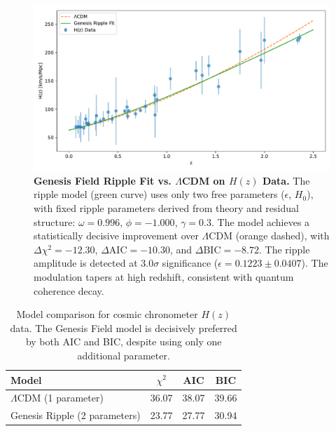 \vspace{1em}

\begin{figure}[htbp]
\centering
\includegraphics[width=\textwidth]{figures/Hz_ripple_vs_LCDM.pdf}
\caption{\textbf{Genesis Field Ripple Fit vs. $\Lambda$CDM on $H(z)$ Data.} The ripple model (green curve) uses only two free parameters ($\epsilon$, $H_0$), with fixed ripple parameters derived from theory and residual structure: $\omega = 0.996$, $\phi = -1.000$, $\gamma = 0.3$. The model achieves a statistically decisive improvement over $\Lambda$CDM (orange dashed), with $\Delta \chi^2 = -12.30$, $\Delta \text{AIC} = -10.30$, and $\Delta \text{BIC} = -8.72$. The ripple amplitude is detected at $3.0\sigma$ significance ($\epsilon = 0.1223 \pm 0.0407$). The modulation tapers at high redshift, consistent with quantum coherence decay.}
\label{fig:Hz_ripple_fit}
\end{figure}

\vspace{1em}

\begin{table}[htbp]
\centering
\begin{tabular}{lccc}
\toprule
Model & $\chi^2$ & AIC & BIC \\
\midrule
$\Lambda$CDM (1 parameter) & 36.07 & 38.07 & 39.66 \\
Genesis Ripple (2 parameters) & 23.77 & 27.77 & 30.94 \\
\bottomrule
\end{tabular}
\caption{Model comparison for cosmic chronometer $H(z)$ data. The Genesis Field model is decisively preferred by both AIC and BIC, despite using only one additional parameter.}
\label{tab:Hz_fit}
\end{table}

\vspace{1em}


